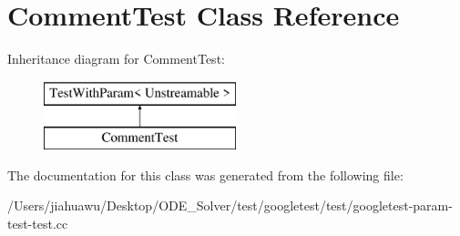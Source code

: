 \hypertarget{class_comment_test}{}\section{Comment\+Test Class Reference}
\label{class_comment_test}
Inheritance diagram for Comment\+Test\+:\begin{figure}[H]
\begin{center}
\leavevmode
\includegraphics[height=2.000000cm]{class_comment_test}
\end{center}
\end{figure}


The documentation for this class was generated from the following file\+:\begin{DoxyCompactItemize}
\item 
/\+Users/jiahuawu/\+Desktop/\+O\+D\+E\+\_\+\+Solver/test/googletest/test/googletest-\/param-\/test-\/test.\+cc\end{DoxyCompactItemize}
